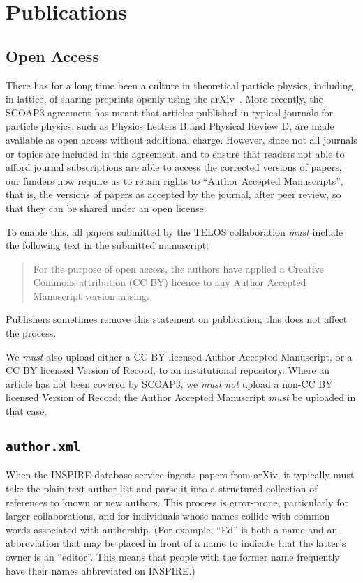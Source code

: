 \documentclass{article}
\newcommand\rfcword[1]{\emph{#1}\xspace}
\newcommand\must{\rfcword{must}}
\newcommand\mustnot{\rfcword{must not}}
\newcommand\filename[1]{\texttt{#1}\xspace}
\newcommand\authorxml{\filename{author.xml}\xspace}
\begin{document}
\section{Publications}

\subsection{Open Access}

There has for a long time been a culture in theoretical particle physics,
including in lattice,
of sharing preprints openly using the arXiv~\cite{ginsparg2021lessons}.
More recently,
the SCOAP3 agreement has meant that
articles published in
typical journals for particle physics,
such as Physics Letters B and Physical Review D,
are made available as open access without additional charge.
However,
since not all journals or topics are included in this agreement,
and to ensure
that readers not able to afford journal subscriptions
are able to access the corrected versions of papers,
our funders now require us to retain rights to
``Author Accepted Manuscripts'',
that is,
the versions of papers as accepted by the journal,
after peer review,
so that they can be shared under an open license.

To enable this,
all papers submitted by the TELOS collaboration
\must include the following text in the submitted manuscript:

\begin{quote}
  For the purpose of open access,
  the authors have applied a Creative Commons attribution (CC BY) licence
  to any Author Accepted Manuscript version arising.
\end{quote}

Publishers sometimes remove this statement on publication;
this does not affect the process.

We \must also upload either a CC BY licensed Author Accepted Manuscript,
or a CC BY licensed Version of Record,
to an institutional repository.
Where an article has not been covered by SCOAP3,
we \mustnot upload a non-CC BY licensed Version of Record;
the Author Accepted Manuscript \must be uploaded in that case.


\subsection{\authorxml}

When the INSPIRE database service ingests papers from arXiv,
it typically must take the plain-text author list
and parse it into a structured collection of references to known or new authors.
This process is error-prone,
particularly for larger collaborations,
and for individuals whose names collide with common words associated with authorship.
(For example,
``Ed'' is both a name
and an abbreviation that may be placed in front of a name
to indicate that the latter's owner is an ``editor''.
This means that people with the former name frequently have their names abbreviated on INSPIRE.)
\end{document}
